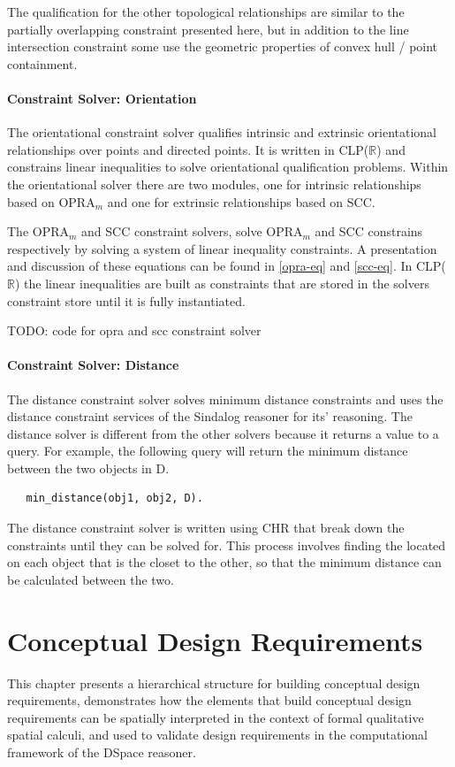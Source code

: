 \documentclass[12pt]{ucthesis}
\begin{document}
The qualification for the other topological relationships are similar to the partially overlapping constraint presented here, but in addition to the line intersection constraint some use the geometric properties of convex hull / point containment.

\subsubsection{Constraint Solver: Orientation}
The orientational constraint solver qualifies intrinsic and extrinsic orientational relationships over points and directed points. It is written in CLP($\mathbb{R}$) and constrains linear inequalities to solve orientational qualification problems. Within the orientational solver there are two modules, one for intrinsic relationships based on OPRA$_{m}$ and one for extrinsic relationships based on SCC.

The OPRA$_{m}$ and SCC constraint solvers, solve OPRA$_{m}$ and SCC constrains respectively by solving a system of linear inequality constraints. A presentation and discussion of these equations can be found in \ref{opra-eq} and \ref{scc-eq}. In CLP($\mathbb{R}$) the linear inequalities are built as constraints that are stored in the solvers constraint store until it is fully instantiated. 

TODO: code for opra and scc constraint solver

\subsubsection{Constraint Solver: Distance}
The distance constraint solver solves minimum distance constraints and uses the distance constraint services of the Sindalog \cite{sindalog} reasoner for its' reasoning. The distance solver is different from the other solvers because it returns a value to a query. For example, the following query will return the minimum distance between the two objects in D.
\begin{verbatim}
   min_distance(obj1, obj2, D). 
\end{verbatim}

The distance constraint solver is written using CHR that break down the constraints until they can be solved for. This process involves finding the located on each object that is the closet to the other, so that the minimum distance can be calculated between the two.  


\chapter{Conceptual Design Requirements}
This chapter presents a hierarchical structure for building conceptual design requirements, demonstrates how the elements that build conceptual design requirements can be spatially interpreted in the context of formal qualitative spatial calculi, and used to validate design requirements in the computational framework of the DSpace reasoner. 
\end{document}
